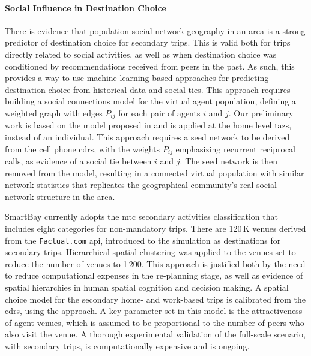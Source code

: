 \paragraph{Social Influence in Destination Choice}
There is evidence that population social network geography in an area is a strong predictor of destination choice for secondary trips. This is valid both for trips directly related to social activities, as well as when destination choice was conditioned by recommendations received from peers in the past. As such, this provides a way to use machine learning-based approaches for predicting destination choice from historical data and social ties. This approach requires building a  social connections model for the virtual agent population, \ie defining a weighted graph with edges $P_{ij}$ for each pair of agents $i$ and $j$. Our preliminary work is based on the model proposed in \citet[][]{McGrathPozdnukhov_UrbComp_2014} and is applied at the home level \glspl{taz}, instead of an individual. This approach requires a seed network to be derived from the cell phone \glspl{cdr}, with the weights $P_{ij}$ emphasizing recurrent reciprocal calls, as evidence of a social tie between $i$ and $j$. The seed network is then removed from the model, resulting in a connected virtual population with similar network statistics that replicates the geographical community's real social network structure in the area. 

SmartBay currently adopts the \gls{mtc}  secondary activities classification that includes eight categories for non-mandatory trips. There are 120\,K venues derived from the \lstinline|Factual.com| \gls{api}, introduced to the simulation as destinations for secondary trips. Hierarchical spatial clustering was applied to the venues set to reduce the number of venues to 1\,200. This approach is justified both by the need to reduce computational expenses in the re-planning stage, as well as evidence of spatial hierarchies in human spatial cognition and decision making. A spatial choice model for the secondary home- and work-based trips is calibrated from the \glspl{cdr}, using the \citet[][]{McArdleEtAl_ACMTIS_2014} approach. A key  parameter set in this model is the attractiveness of agent venues, which is assumed to be proportional to the number of peers who also visit the venue. A thorough experimental validation of the full-scale scenario, with secondary trips, is computationally expensive and is ongoing.

